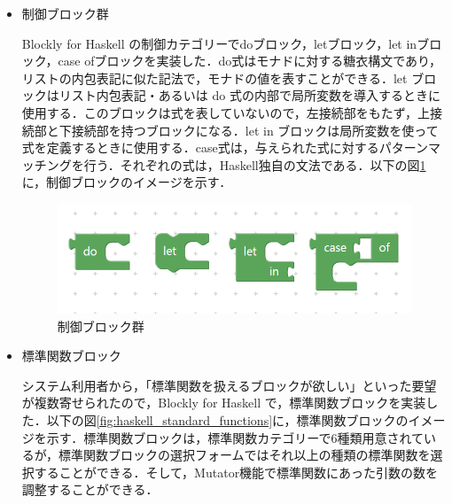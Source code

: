 \documentclass{risepaper}
\begin{document}
\begin{itemize}
\item 制御ブロック群

Blockly for Haskell の制御カテゴリーでdoブロック，letブロック，let inブロック，case ofブロックを実装した．do式はモナドに対する糖衣構文であり，リストの内包表記に似た記法で，モナドの値を表すことができる．let ブロックはリスト内包表記・あるいは do 式の内部で局所変数を導入するときに使用する．このブロックは式を表していないので，左接続部をもたず，上接続部と下接続部を持つブロックになる．let in ブロックは局所変数を使って式を定義するときに使用する．case式は，与えられた式に対するパターンマッチングを行う．それぞれの式は，Haskell独自の文法である．以下の図\ref{fig:haskell_control}に，制御ブロックのイメージを示す．

\begin{figure}[h]
\begin{center}
\includegraphics[scale=0.5]{img/haskell_control.PNG}
\caption{制御ブロック群}%
\label{fig:haskell_control}
\end{center}%
\end{figure}%

\item 標準関数ブロック

システム利用者から，「標準関数を扱えるブロックが欲しい」といった要望が複数寄せられたので，Blockly for Haskell で，標準関数ブロックを実装した．以下の図\ref{fig:haskell_standard_functions}に，標準関数ブロックのイメージを示す．標準関数ブロックは，標準関数カテゴリーで6種類用意されているが，標準関数ブロックの選択フォームではそれ以上の種類の標準関数を選択することができる．そして，Mutator機能で標準関数にあった引数の数を調整することができる．


\end{itemize}
\end{document}
